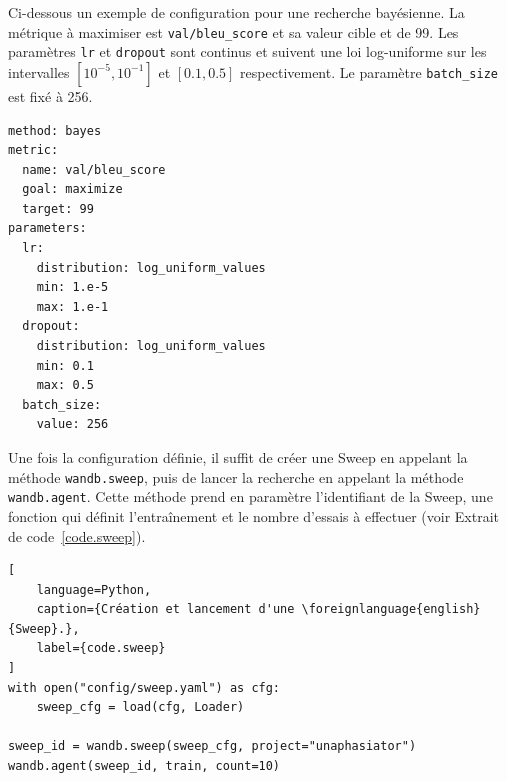 Ci-dessous un exemple de configuration pour une recherche bayésienne.
La métrique à maximiser est \verb|val/bleu_score| et sa valeur cible et de 99.
Les paramètres \verb|lr| et \verb|dropout| sont continus et suivent une loi log-uniforme
sur les intervalles \([10^{-5}, 10^{-1}]\) et \([0.1, 0.5]\) respectivement.
Le paramètre \verb|batch_size| est fixé à 256.

\begin{verbatim}
method: bayes
metric:
  name: val/bleu_score
  goal: maximize
  target: 99
parameters:
  lr:
    distribution: log_uniform_values
    min: 1.e-5
    max: 1.e-1
  dropout:
    distribution: log_uniform_values
    min: 0.1
    max: 0.5
  batch_size:
    value: 256
\end{verbatim}

Une fois la configuration définie, 
il suffit de créer une \foreignlanguage{english}{Sweep} en appelant la méthode \verb|wandb.sweep|,
puis de lancer la recherche en appelant la méthode \verb|wandb.agent|.
Cette méthode prend en paramètre l'identifiant de la \foreignlanguage{english}{Sweep}, 
une fonction qui définit l'entraînement et le nombre d'essais à effectuer (voir Extrait de code~\ref{code.sweep}).

\begin{lstlisting}[
    language=Python,
    caption={Création et lancement d'une \foreignlanguage{english}{Sweep}.},
    label={code.sweep}
]
with open("config/sweep.yaml") as cfg:
    sweep_cfg = load(cfg, Loader)

sweep_id = wandb.sweep(sweep_cfg, project="unaphasiator")
wandb.agent(sweep_id, train, count=10)
\end{lstlisting}



